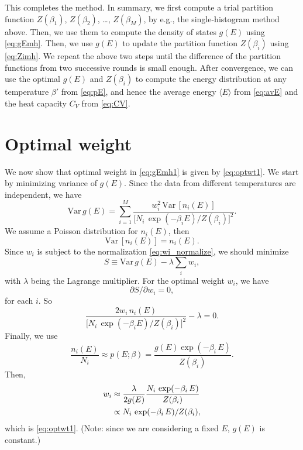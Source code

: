 \documentclass[12pt]{article}
\begin{document}
This completes the method.
%
In summary,
we first compute a trial partition function
$Z(\beta_1)$, $Z(\beta_2)$, \dots, $Z(\beta_M)$,
by e.g., the single-histogram method above.
%
Then, we use them to compute the density of states $g(E)$
using \eqref{eq:gEmh}.
Then, we use $g(E)$ to update the partition function $Z(\beta_i)$
using \eqref{eq:Zimh}.
%
We repeat the above two steps until
the difference of the partition functions
from two successive rounds is small enough.
%
After convergence, we can use the optimal $g(E)$ and $Z(\beta_i)$
to compute the energy distribution at any temperature $\beta'$
from \eqref{eq:pE},
and hence the average energy $\langle E \rangle$ from \eqref{eq:avE}
and the heat capacity $C_V$ from \eqref{eq:CV}.



\section{\label{sec:optwt}Optimal weight}

We now show that optimal weight in \eqref{eq:gEmh1}
is given by \eqref{eq:optwt1}.
%
We start by minimizing variance of $g(E)$.
%
Since the data from different temperatures are independent,
we have
%
\newcommand{\Var}{\mathrm{Var}\,}
%
\begin{equation}
  \Var g(E)
= \sum_{i = 1}^M
\frac{ w_i^2 \, \Var[ n_i(E) ] }
{ \big[ N_i \, \exp(-\beta_i E) / Z(\beta_i) \big]^2 }.
\end{equation}
%
We assume a Poisson distribution for $n_i(E)$,
then
\[
  \Var[ n_i(E) ] = n_i(E).
\]
Since $w_i$ is subject to the normalization \eqref{eq:wi_normalize},
we should minimize
\[
  S \equiv \Var g(E) - \lambda \sum_i w_i,
\]
with $\lambda$ being the Lagrange multiplier.
%
For the optimal weight $w_i$, we have
\[
  \partial S / \partial w_i = 0,
\]
for each $i$.
%
So
\begin{equation}
  \frac { 2 w_i \, n_i(E) }
{ \big[ N_i \, \exp(-\beta_i E) / Z(\beta_i) \big]^2 }
  - \lambda = 0.
\label{eq:wi_minimization}
\end{equation}
Finally,
we use
\[
  \frac{ n_i(E) }{ N_i }
  \approx p(E; \beta)
  =
  \frac{ g(E) \exp(-\beta_i \, E) } { Z(\beta_i) }.
\]
Then,
\begin{align}
  w_i &\approx \frac{ \lambda } { 2 g(E) }
  \frac{ N_i \, \exp(-\beta_i \, E) } { Z(\beta_i) }
  \notag \\
&\propto N_i \, \exp(-\beta_i \, E) / Z(\beta_i),
\end{align}
which is \eqref{eq:optwt1}.
(Note: since we are considering a fixed $E$, $g(E)$ is constant.)
\end{document}
